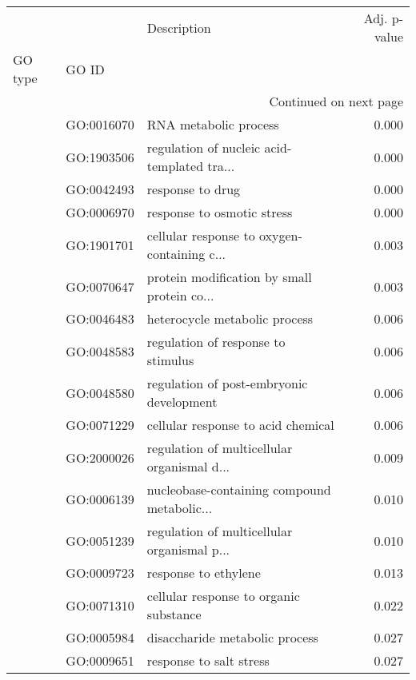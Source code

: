 \begin{longtable}{lllr}
\toprule
   &            &                                  Description &  Adj. p-value \\
GO type & GO ID &                                              &               \\
\midrule
\endhead
\midrule
\multicolumn{4}{r}{{Continued on next page}} \\
\midrule
\endfoot

\bottomrule
\endlastfoot
\multirow{46}{*}{BP} & GO:0016070 &                        RNA metabolic process &         0.000 \\
   & GO:1903506 &  regulation of nucleic acid-templated tra... &         0.000 \\
   & GO:0042493 &                             response to drug &         0.000 \\
   & GO:0006970 &                   response to osmotic stress &         0.000 \\
   & GO:1901701 &  cellular response to oxygen-containing c... &         0.003 \\
   & GO:0070647 &  protein modification by small protein co... &         0.003 \\
   & GO:0046483 &                heterocycle metabolic process &         0.006 \\
   & GO:0048583 &           regulation of response to stimulus &         0.006 \\
   & GO:0048580 &     regulation of post-embryonic development &         0.006 \\
   & GO:0071229 &           cellular response to acid chemical &         0.006 \\
   & GO:2000026 &  regulation of multicellular organismal d... &         0.009 \\
   & GO:0006139 &  nucleobase-containing compound metabolic... &         0.010 \\
   & GO:0051239 &  regulation of multicellular organismal p... &         0.010 \\
   & GO:0009723 &                         response to ethylene &         0.013 \\
   & GO:0071310 &       cellular response to organic substance &         0.022 \\
   & GO:0005984 &               disaccharide metabolic process &         0.027 \\
   & GO:0009651 &                      response to salt stress &         0.027 \\

\end{longtable}
